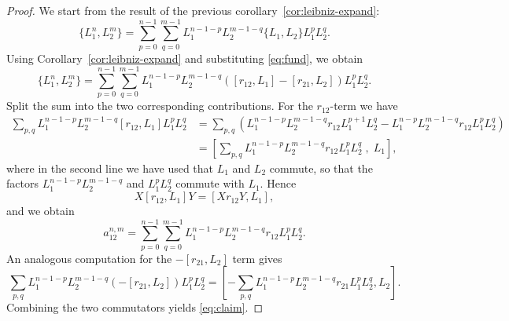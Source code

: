 \begin{proof}
   We start from the result of the previous corollary~\ref{cor:leibniz-expand}:
    \begin{equation}
        \{ L_1^n, L_2^m \} = \sum_{p=0}^{n-1} \sum_{q=0}^{m-1} L_1^{n-1-p} L_2^{m-1-q} \{ L_1, L_2 \} L_1^{p} L_2^{q}.
    \end{equation}
    Using Corollary~\ref{cor:leibniz-expand} and substituting \eqref{eq:fund}, we obtain
    \begin{equation}
        \{ L_1^n, L_2^m \}
        =\sum_{p=0}^{n-1} \sum_{q=0}^{m-1}
        L_1^{n-1-p} L_2^{m-1-q} \left( [r_{12}, L_1] - [r_{21}, L_2] \right) L_1^{p} L_2^{q}.
    \end{equation}
    Split the sum into the two corresponding contributions. For the $r_{12}$-term we have
    \begin{align}
        \sum_{p,q} L_1^{n-1-p} L_2^{m-1-q} [r_{12}, L_1] L_1^{p} L_2^{q} &= \sum_{p,q} \left( L_1^{n-1-p} L_2^{m-1-q} r_{12} L_1^{p+1} L_2^{q} - L_1^{n-p} L_2^{m-1-q} r_{12} L_1^{p} L_2^{q} \right)\\
        &= \left[ \sum_{p,q} L_1^{n-1-p}L_2^{m-1-q} r_{12} L_1^{p}L_2^{q}\;, \;L_1 \right],
    \end{align}
    where in the second line we have used that $L_1$ and $L_2$ commute, so that the factors $L_1^{n-1-p}L_2^{m-1-q}$ and $L_1^{p}L_2^{q}$ commute with $L_1$. Hence
    \begin{equation}
        X [r_{12},L_1] Y = [X r_{12} Y, L_1],
    \end{equation}
    and we obtain
    \begin{equation}
        a_{12}^{n,m} = \sum_{p=0}^{n-1}\sum_{q=0}^{m-1}
        L_1^{n-1-p} L_2^{m-1-q} r_{12} L_1^{p} L_2^{q}.
    \end{equation}
    An analogous computation for the $-[r_{21},L_2]$ term gives
    \begin{equation}
    \sum_{p,q} L_1^{n-1-p} L_2^{m-1-q} (-[r_{21},L_2]) L_1^{p} L_2^{q}
    =
    \left[
    -\sum_{p,q} L_1^{n-1-p} L_2^{m-1-q} r_{21} L_1^{p} L_2^{q},
    L_2
    \right].
\end{equation}
Combining the two commutators yields \eqref{eq:claim}.


    
\end{proof}

